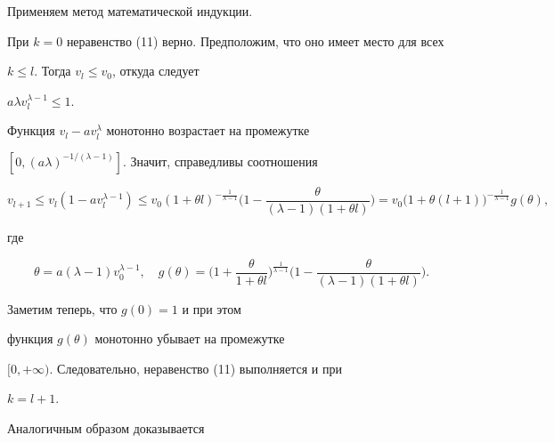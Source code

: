 \begin{pf}


Применяем метод математической индукции.


При $k=0$ неравенство (11) верно. Предположим, что оно имеет место для всех


$k\leq l$. Тогда $v_l\leq v_0$, откуда следует


$a \lambda v^{\lambda-1}_l{\leq}1$.


Функция $v_l-av^\lambda_l$ монотонно возрастает на промежутке


$[0, (a\lambda)^{-1/(\lambda-1)}]$. Значит, справедливы соотношения


$$


v_{l+1}\leq v_l (1-av^{\lambda-1}_l)\leq


v_0 (1+ \theta l)^{-\frac1{\lambda-1}}


\bigg(1-\frac{\theta}{(\lambda-1)(1+ \theta l)}\bigg)=


v_0 \big(1+ \theta (l+1)\big)^{-\frac1{\lambda-1}} g(\theta),


$$


где


$$


\theta=a (\lambda-1) v^{\lambda-1}_0, \quad


g(\theta)=\bigg(1+\frac{\theta}{1+ \theta l}\bigg)^{\frac1{\lambda-1}}


\bigg(1-\frac{\theta}{(\lambda-1)(1+ \theta l)}\bigg).


$$





Заметим теперь, что $g(0)=1$ и при этом


функция $g(\theta)$ монотонно убывает на промежутке


$[0, +\infty)$. Следовательно, неравенство (11) выполняется и при


$k=l+1$.


\end{pf}





Аналогичным образом доказывается





